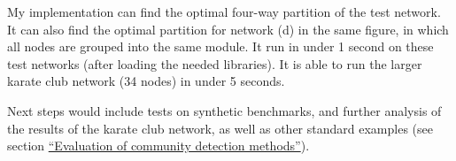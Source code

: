 My implementation can find the optimal four-way partition of the test
network. It can also find the optimal partition for network (d) in the
same figure, in which all nodes are grouped into the same module. It run
in under 1 second on these test networks (after loading the needed
libraries). It is able to run the larger karate club network (34 nodes)
in under 5 seconds.

Next steps would include tests on synthetic benchmarks, and further
analysis of the results of the karate club network, as well as other
standard examples (see section
\protect\hyperlink{evaluation}{``Evaluation of community detection
methods''}).

